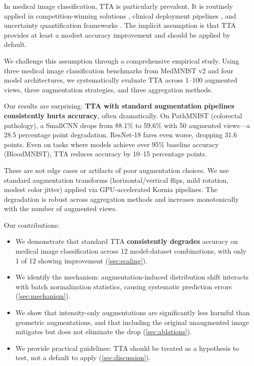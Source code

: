 \documentclass{article}
\theoremstyle{plain}
\theoremstyle{definition}
\theoremstyle{remark}
\begin{document}
In medical image classification, TTA is particularly prevalent. It is routinely applied in competition-winning solutions \citep{matsunaga2017image}, clinical deployment pipelines \citep{wang2019aleatoric}, and uncertainty quantification frameworks \citep{moshkov2020test}. The implicit assumption is that TTA provides at least a modest accuracy improvement and should be applied by default.

We challenge this assumption through a comprehensive empirical study. Using three medical image classification benchmarks from MedMNIST v2 \citep{yang2023medmnist} and four model architectures, we systematically evaluate TTA across 1--100 augmented views, three augmentation strategies, and three aggregation methods.

Our results are surprising: \textbf{TTA with standard augmentation pipelines consistently hurts accuracy}, often dramatically. On PathMNIST (colorectal pathology), a SmallCNN drops from 88.1\% to 59.6\% with 50 augmented views---a 28.5 percentage point degradation. ResNet-18 fares even worse, dropping 31.6 points. Even on tasks where models achieve over 95\% baseline accuracy (BloodMNIST), TTA reduces accuracy by 10--15 percentage points.

These are not edge cases or artifacts of poor augmentation choices. We use standard augmentation transforms (horizontal/vertical flips, mild rotation, modest color jitter) applied via GPU-accelerated Kornia pipelines. The degradation is robust across aggregation methods and increases monotonically with the number of augmented views.

Our contributions:
\begin{itemize}
    \item We demonstrate that standard TTA \textbf{consistently degrades} accuracy on medical image classification across 12 model-dataset combinations, with only 1 of 12 showing improvement (\cref{sec:scaling}).
    \item We identify the mechanism: augmentation-induced distribution shift interacts with batch normalization statistics, causing systematic prediction errors (\cref{sec:mechanism}).
    \item We show that intensity-only augmentations are significantly less harmful than geometric augmentations, and that including the original unaugmented image mitigates but does not eliminate the drop (\cref{sec:ablations}).
    \item We provide practical guidelines: TTA should be treated as a hypothesis to test, not a default to apply (\cref{sec:discussion}).
\end{itemize}
\end{document}
